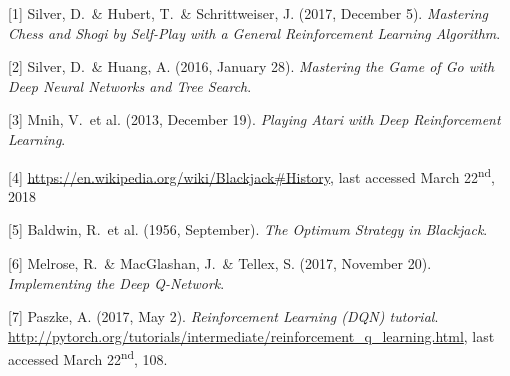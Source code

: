 \documentclass{article}
\begin{document}
[1] Silver, D.\ \& Hubert, T.\ \& Schrittweiser, J. (2017, December 5). \textit{Mastering Chess and Shogi by Self-Play with a General Reinforcement Learning Algorithm}.

[2] Silver, D.\ \& Huang, A. (2016, January 28). \textit{Mastering the Game of Go with Deep Neural Networks and Tree Search}.

[3] Mnih, V.\ et al. (2013, December 19). \textit{Playing Atari with Deep Reinforcement Learning}.

[4] \url{https://en.wikipedia.org/wiki/Blackjack#History}, last accessed March 22\textsuperscript{nd}, 2018

[5] Baldwin, R.\ et al. (1956, September). \textit{The Optimum Strategy in Blackjack}.

[6] Melrose, R.\ \& MacGlashan, J.\ \& Tellex, S. (2017, November 20). \textit{Implementing the Deep Q-Network}.

[7] Paszke, A. (2017, May 2). \textit{Reinforcement Learning (DQN) tutorial}. \url{http://pytorch.org/tutorials/intermediate/reinforcement_q_learning.html}, last accessed March 22\textsuperscript{nd}, 108. 
\end{document}
